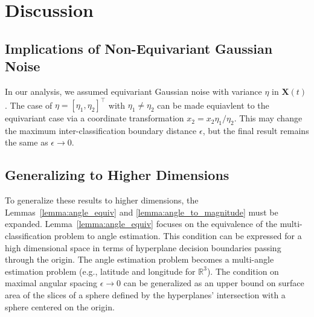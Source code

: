 \documentclass[12pt]{article}
\begin{document}
\section{Discussion}

\subsection{Implications of Non-Equivariant Gaussian Noise}
In our analysis, we assumed equivariant Gaussian noise with variance $\eta$ in
$\mathbf X(t)$. 
The case of $\eta = [\eta_1, \eta_2]^\top$ with $\eta_1\neq\eta_2$ can be made
equiavlent to the equivariant case via a coordinate transformation $x_2 = x_2
\eta_1 / \eta_2$. 
This may change the maximum inter-classification boundary distance $\epsilon$, 
but the final result remains the same as $\epsilon \to 0$. 


\subsection{Generalizing to Higher Dimensions}
To generalize these results to higher dimensions, the Lemmas~\ref{lemma:angle_equiv} and \ref{lemma:angle_to_magnitude} must be expanded. 
Lemma~\ref{lemma:angle_equiv} focuses on the equivalence of the multi-classification problem to angle estimation. 
This condition can be expressed for a high dimensional space in terms of hyperplane decision boundaries passing through the origin. 
The angle estimation problem becomes a multi-angle estimation problem (e.g., latitude and longitude for $\mathbb R^3$). 
The condition on maximal angular spacing $\epsilon \to 0$ can be generalized as an upper bound on surface area of the slices of a sphere defined by the hyperplanes' intersection with a sphere centered on the origin. 
\end{document}
